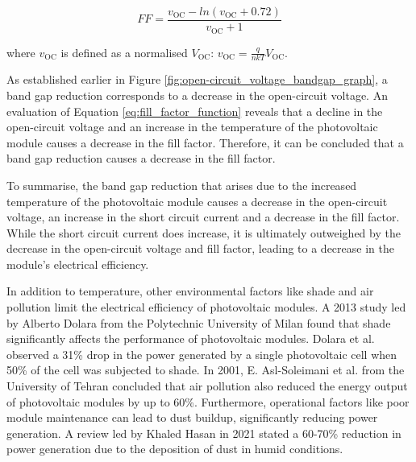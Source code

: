 \begin{equation}
    FF = \frac{v_\text{OC} - ln(v_\text{OC} + 0.72)}{v_\text{OC} + 1}
    \label{eq:fill_factor_function}
\end{equation}

where $v_\text{OC}$ is defined as a normalised $V_\text{OC}$: $v_\text{OC} = \frac{q}{nkT} V_\text{OC}$. \cite{Green1981SolarExpressions}\vspace{0.5em}

As established earlier in Figure \ref{fig:open-circuit_voltage_bandgap_graph}, a band gap reduction corresponds to a decrease in the open-circuit voltage. An evaluation of Equation \ref{eq:fill_factor_function} reveals that a decline in the open-circuit voltage and an increase in the temperature of the photovoltaic module causes a decrease in the fill factor. Therefore, it can be concluded that a band gap reduction causes a decrease in the fill factor.\vspace{0.5em}

To summarise, the band gap reduction that arises due to the increased temperature of the photovoltaic module causes a decrease in the open-circuit voltage, an increase in the short circuit current and a decrease in the fill factor. While the short circuit current does increase, it is ultimately outweighed by the decrease in the open-circuit voltage and fill factor, leading to a decrease in the module's electrical efficiency.\vspace{0.5em}

In addition to temperature, other environmental factors like shade and air pollution limit the electrical efficiency of photovoltaic modules. A 2013 study led by Alberto Dolara from the Polytechnic University of Milan found that shade significantly affects the performance of photovoltaic modules. Dolara et al. observed a 31\% drop in the power generated by a single photovoltaic cell when 50\% of the cell was subjected to shade. \cite{Dolara2013ExperimentalModules} In 2001, E. Asl-Soleimani et al. from the University of Tehran concluded that air pollution also reduced the energy output of photovoltaic modules by up to 60\%. \cite{Asl-Soleimani2001TheTehran} Furthermore, operational factors like poor module maintenance can lead to dust buildup, significantly reducing power generation. A review led by Khaled Hasan in 2021 stated a 60-70\% reduction in power generation due to the deposition of dust in humid conditions. \cite{Hasan2022EffectsReview} \vspace{0.5em} 

